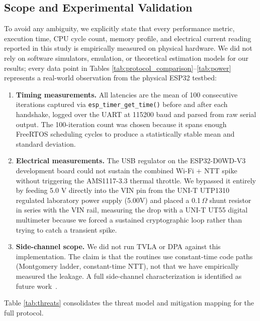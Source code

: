 \documentclass[journal, 10pt]{IEEEtran}
\begin{document}
\subsection{Scope and Experimental Validation}
To avoid any ambiguity, we explicitly state that every performance metric, execution time, CPU cycle count, memory profile, and electrical current reading reported in this study is empirically measured on physical hardware. We did not rely on software simulators, emulation, or theoretical estimation models for our results; every data point in Tables \ref{tab:protocol_comparison}--\ref{tab:power} represents a real-world observation from the physical ESP32 testbed:
\begin{enumerate}
\item \textbf{Timing measurements.} All latencies are the mean of 100 consecutive iterations captured via \texttt{esp\_timer\_get\_time()} before and after each handshake, logged over the UART at 115200 baud and parsed from raw serial output. The 100-iteration count was chosen because it spans enough FreeRTOS scheduling cycles to produce a statistically stable mean and standard deviation.
\item \textbf{Electrical measurements.} The USB regulator on the ESP32-D0WD-V3 development board could not sustain the combined Wi-Fi + NTT spike without triggering the AMS1117-3.3 thermal throttle. We bypassed it entirely by feeding 5.0 V directly into the VIN pin from the UNI-T UTP1310 regulated laboratory power supply (5.00V) and placed a 0.1\,$\Omega$ shunt resistor in series with the VIN rail, measuring the drop with a UNI-T UT55 digital multimeter because we forced a sustained cryptographic loop rather than trying to catch a transient spike.
\item \textbf{Side-channel scope.} We did not run TVLA or DPA against this implementation. The claim is that the routines use constant-time code paths (Montgomery ladder, constant-time NTT), not that we have empirically measured the leakage. A full side-channel characterization is identified as future work~\cite{b18,b40}.
\end{enumerate}

Table \ref{tab:threats} consolidates the threat model and mitigation mapping for the full protocol.
\end{document}
